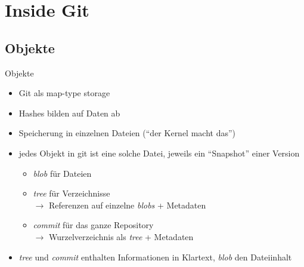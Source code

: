 \section{Inside Git}
\subsection{Objekte}
\begin{frame}{Objekte}
    \begin{itemize}
        \item Git als map-type storage
        \item Hashes bilden auf Daten ab
        \item Speicherung in einzelnen Dateien (``der Kernel macht das'')
        \item jedes Objekt in git ist eine solche Datei, jeweils ein ``Snapshot''
            einer Version
            \begin{itemize}
                \item \emph{blob} für Dateien
                \item \emph{tree} für Verzeichnisse\\
                    $\rightarrow$ Referenzen auf einzelne \emph{blobs} + Metadaten
                \item \emph{commit} für das ganze Repository\\
                    $\rightarrow$ Wurzelverzeichnis als \emph{tree} + Metadaten
            \end{itemize}
        \item \emph{tree} und \emph{commit} enthalten Informationen in Klartext,  \emph{blob} den Dateiinhalt
    \end{itemize}

    \pause
    \vspace{0.5em}
\end{frame}

